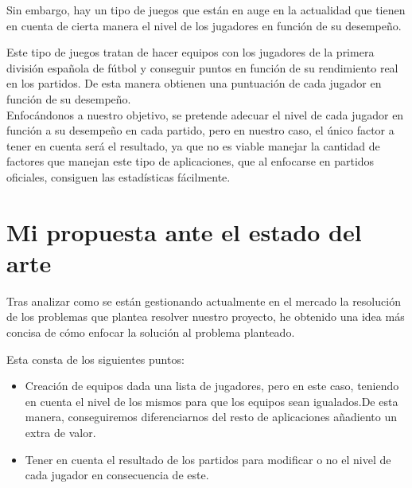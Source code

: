 Sin embargo, hay un tipo de juegos que están en auge en la actualidad que tienen en cuenta de cierta manera el nivel de los
jugadores en función de su desempeño.

Este tipo de juegos tratan de hacer equipos con los jugadores de la primera división española de fútbol y conseguir puntos en función
de su rendimiento real en los partidos. De esta manera obtienen una puntuación de cada jugador en función de su desempeño.\\

Enfocándonos a nuestro objetivo, se pretende adecuar el nivel de cada jugador en función a su desempeño en cada partido, pero en nuestro caso,
el único factor a tener en cuenta será el resultado, ya que no es viable manejar la cantidad de factores que manejan este tipo de aplicaciones,
que al enfocarse en partidos oficiales, consiguen las estadísticas fácilmente.

\section{Mi propuesta ante el estado del arte}

Tras analizar como se están gestionando actualmente en el mercado la resolución de los problemas que plantea resolver nuestro proyecto, he obtenido
una idea más concisa de cómo enfocar la solución al problema planteado.

Esta consta de los siguientes puntos:

\begin{itemize}
    \item Creación de equipos dada una lista de jugadores, pero en este caso, teniendo en cuenta el nivel de los mismos para que los equipos sean igualados.De esta manera, conseguiremos diferenciarnos
    del resto de aplicaciones añadiento un extra de valor.
    \item Tener en cuenta el resultado de los partidos para modificar o no el nivel de cada jugador en consecuencia de este.
\end{itemize}
